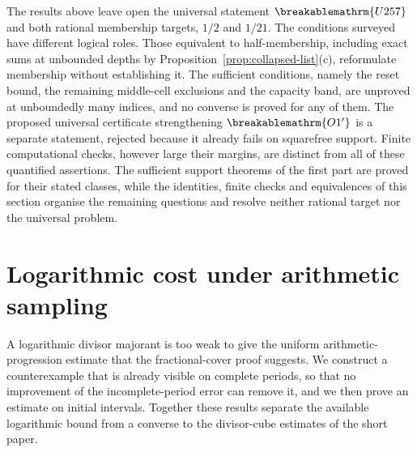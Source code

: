 \documentclass[11pt]{article}
\theoremstyle{plain}
\theoremstyle{definition}
\theoremstyle{remark}
\renewcommand{\mathrm}[1]{\ifmmode\breakablemathrm{#1}\else\textrm{#1}\fi}%
\begin{document}
The results above leave open the universal statement
$\mathrm{U257}$ and both rational membership targets, $1/2$ and
$1/21$.  The conditions surveyed have different logical roles.
Those equivalent to half-membership, including exact sums at unbounded
depths by Proposition~\ref{prop:collapsed-list}(c), reformulate
membership without establishing it.  The sufficient conditions, namely the
reset bound, the remaining middle-cell exclusions and the capacity band,
are unproved at unboundedly many indices, and
no converse is proved for any of them.  The proposed universal certificate
strengthening $\mathrm{O1'}$ is a separate statement, rejected because it
already fails on squarefree support.  Finite computational checks,
however large their margins, are distinct from all of these quantified
assertions. The sufficient support theorems of the first part are proved for their
stated classes, while the identities, finite checks and equivalences of this
section organise the remaining questions and resolve neither
rational target nor the universal problem.

\clearpage
\section{Logarithmic cost under arithmetic sampling}\label{sec:257-logarithmic-sampling}
A logarithmic divisor majorant is too weak to give the uniform
arithmetic-progression estimate that the fractional-cover proof suggests.
We construct a counterexample that is already visible on complete periods, so
that no improvement of the incomplete-period error can remove it, and we then
prove an estimate on initial intervals. Together these results separate the
available logarithmic bound from a converse to the divisor-cube estimates of
the short paper.
\end{document}
